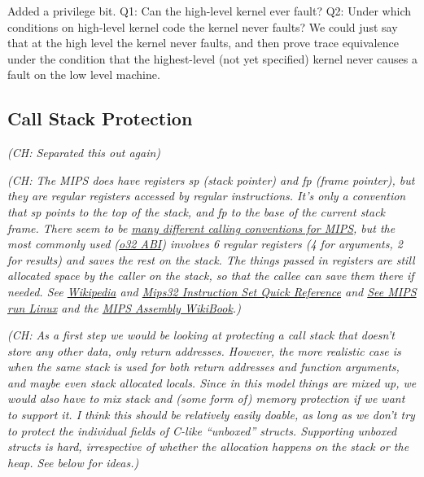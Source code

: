 \documentclass{article}
\newcommand{\ch}[1]{{\color{dkblue}\em (CH: #1)}}
\begin{document}
Added a privilege bit.
Q1: Can the high-level kernel ever fault?
Q2: Under which conditions on high-level kernel code the kernel never faults?
We could just say that at the high level the kernel never faults,
and then prove trace equivalence under the condition that the
highest-level (not yet specified) kernel never causes a fault on the
low level machine.

\ottdefnkastep

\subsection{Call Stack Protection}
\label{sec:stack}

\ch{Separated this out again}

\ch{The MIPS does have registers sp (stack pointer) and fp (frame
  pointer), but they are regular registers accessed by regular
  instructions. It's only a convention that sp points to the top of
  the stack, and fp to the base of the current stack frame.  There
  seem to be
  \href{http://www.linux-mips.org/wiki/WhatsWrongWithO32N32N64}{many
    different calling conventions for MIPS}, but the most commonly
  used
  (\href{http://math-atlas.sourceforge.net/devel/assembly/mipsabi32.pdf}{o32
    ABI}) involves 6 regular registers (4 for arguments, 2 for
  results) and saves the rest on the stack. The things passed in
  registers are still allocated space by the caller on the stack, so
  that the callee can save them there if needed. See
  \href{https://en.wikipedia.org/wiki/Calling_convention\#MIPS}{Wikipedia}
  and
  \href{http://www.cs.iastate.edu/~cs321/MD00565-2B-MIPS32-QRC-01.01.pdf}{Mips32
    Instruction Set Quick Reference} and
  \href{http://people.openrays.org/~comcat/godson/doc/See.MIPS.Run.2nd.en.pdf}{See
    MIPS run Linux} and the
  \href{https://en.wikibooks.org/wiki/MIPS_Assembly/Control_Flow_Instructions}{MIPS
    Assembly WikiBook}.}

\ch{As a first step we would be looking at protecting a call stack
  that doesn't store any other data, only return addresses. However,
  the more realistic case is when the same stack is used for both
  return addresses and function arguments, and maybe even stack
  allocated locals. Since in this model things are mixed up, we would
  also have to mix stack and (some form of) memory protection if we
  want to support it. I think this should be relatively easily doable,
  as long as we don't try to protect the individual fields of C-like
  ``unboxed'' structs. Supporting unboxed structs is hard,
  irrespective of whether the allocation happens on the stack or the
  heap. See below for ideas.}
\end{document}
